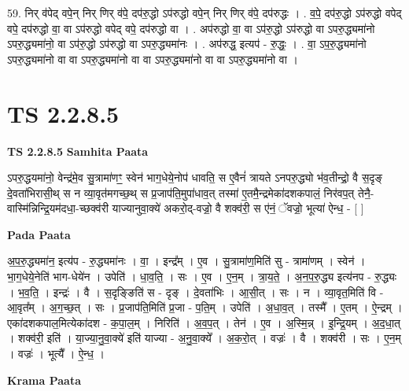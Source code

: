 \documentclass[17pt]{extarticle}
\begin{document}
59. निर् व॑पेद् वपे॒न् निर् णिर् व॑पे॒ दप॑रु॒द्धो ऽप॑रुद्धो वपे॒न् निर् णिर् व॑पे॒ दप॑रुद्धः । . व॒पे॒ दप॑रु॒द्धो ऽप॑रुद्धो वपेद् वपे॒ दप॑रुद्धो वा॒ वा ऽप॑रुद्धो वपेद् वपे॒ दप॑रुद्धो वा । . अप॑रुद्धो वा॒ वा ऽप॑रु॒द्धो ऽप॑रुद्धो वा ऽपरु॒द्ध्यमा॑नो ऽपरु॒द्ध्यमा॑नो॒ वा ऽप॑रु॒द्धो ऽप॑रुद्धो वा ऽपरु॒द्ध्यमा॑नः । . अप॑रुद्ध॒ इत्यप॑ - रु॒द्धः॒ । . वा॒ ऽप॒रु॒द्ध्यमा॑नो ऽपरु॒द्ध्यमा॑नो वा वा ऽपरु॒द्ध्यमा॑नो वा वा ऽपरु॒द्ध्यमा॑नो वा वा ऽपरु॒द्ध्यमा॑नो वा । \newline
\pagebreak
{}

\section{ TS 2.2.8.5 }

\textbf{TS 2.2.8.5 } \newline
\textbf{Samhita Paata} \newline

ऽपरु॒द्धयमा॑नो॒ वेन्द्र॑मे॒व सु॒त्रामा॑णꣳ॒॒ स्वेन॑ भाग॒धेये॒नोप॑ धावति॒ स ए॒वैनं॑ त्रायते ऽनपरु॒द्ध्यो भ॑व॒तीन्द्रो॒ वै स॒दृङ् दे॒वता॑भिरासी॒थ् स न व्या॒वृत॑मगच्छ॒थ् स प्र॒जाप॑ति॒मुपा॑धाव॒त् तस्मा॑ ए॒तमै॒न्द्रमेका॑दशकपालं॒ निर॑वप॒त् तेनै॒-वास्मि॑न्निन्द्रि॒यम॑दधा॒-च्छक्व॑री याज्यानुवा॒क्ये॑ अकरो॒द्-वज्रो॒ वै शक्व॑री॒ स ए॑नं॒ ॅवज्रो॒ भूत्या॑ ऐन्ध॒ - [  ] \newline

\textbf{Pada Paata} \newline

अ॒प॒रु॒द्ध्यमा॑न॒ इत्य॑प - रु॒द्ध्यमा॑नः । वा॒ । इन्द्र᳚म् । ए॒व । सु॒त्रामा॑ण॒मिति॑ सु - त्रामा॑णम् । स्वेन॑ । भा॒ग॒धेये॒नेति॑ भाग-धेये॑न । उपेति॑ । धा॒व॒ति॒ । सः । ए॒व । ए॒न॒म् । त्रा॒य॒ते॒ । अ॒न॒प॒रु॒द्ध्य इत्य॑नप - रु॒द्ध्यः । भ॒व॒ति॒ । इन्द्रः॑ । वै । स॒दृङ्ङिति॑ स - दृङ् । दे॒वता॑भिः । आ॒सी॒त् । सः । न । व्या॒वृत॒मिति॑ वि - आ॒वृत᳚म् । अ॒ग॒च्छ॒त् । सः । प्र॒जाप॑ति॒मिति॑ प्र॒जा - प॒ति॒म् । उपेति॑ । अ॒धा॒व॒त् । तस्मै᳚ । ए॒तम् । ऐ॒न्द्रम् । एका॑दशकपाल॒मित्येका॑दश - क॒पा॒ल॒म् । निरिति॑ । अ॒व॒प॒त् । तेन॑ । ए॒व । अ॒स्मि॒न्न् । इ॒न्द्रि॒यम् । अ॒द॒धा॒त् । शक्व॑री॒ इति॑ । या॒ज्या॒नु॒वा॒क्ये॑ इति॑ याज्या - अ॒नु॒वा॒क्ये᳚ । अ॒क॒रो॒त् । वज्रः॑ । वै । शक्व॑री । सः । ए॒न॒म् । वज्रः॑ । भूत्यै᳚ । ऐ॒न्ध॒ ।  \newline


\textbf{Krama Paata} \newline
\end{document}
